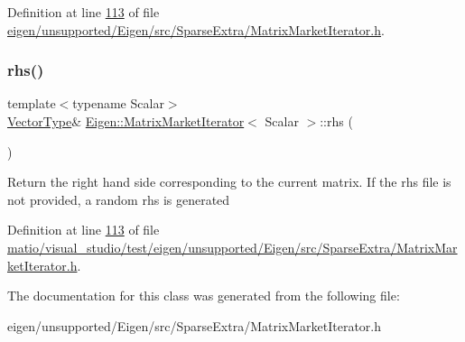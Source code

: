 Definition at line \hyperlink{eigen_2unsupported_2_eigen_2src_2_sparse_extra_2_matrix_market_iterator_8h_source_l00113}{113} of file \hyperlink{eigen_2unsupported_2_eigen_2src_2_sparse_extra_2_matrix_market_iterator_8h_source}{eigen/unsupported/\+Eigen/src/\+Sparse\+Extra/\+Matrix\+Market\+Iterator.\+h}.

\mbox{\label{class_eigen_1_1_matrix_market_iterator_ac141e537f3bc3a3c078a2780a6a956b6}} 
\subsubsection{\texorpdfstring{rhs()}{rhs()}\hspace{0.1cm}{\footnotesize\ttfamily [2/2]}}
{\footnotesize\ttfamily template$<$typename Scalar$>$ \\
\hyperlink{group___core___module}{Vector\+Type}\& \hyperlink{class_eigen_1_1_matrix_market_iterator}{Eigen\+::\+Matrix\+Market\+Iterator}$<$ Scalar $>$\+::rhs (\begin{DoxyParamCaption}{ }\end{DoxyParamCaption})\hspace{0.3cm}{\ttfamily [inline]}}

Return the right hand side corresponding to the current matrix. If the rhs file is not provided, a random rhs is generated 

Definition at line \hyperlink{matio_2visual__studio_2test_2eigen_2unsupported_2_eigen_2src_2_sparse_extra_2_matrix_market_iterator_8h_source_l00113}{113} of file \hyperlink{matio_2visual__studio_2test_2eigen_2unsupported_2_eigen_2src_2_sparse_extra_2_matrix_market_iterator_8h_source}{matio/visual\+\_\+studio/test/eigen/unsupported/\+Eigen/src/\+Sparse\+Extra/\+Matrix\+Market\+Iterator.\+h}.



The documentation for this class was generated from the following file\+:\begin{DoxyCompactItemize}
\item 
eigen/unsupported/\+Eigen/src/\+Sparse\+Extra/\+Matrix\+Market\+Iterator.\+h\end{DoxyCompactItemize}
